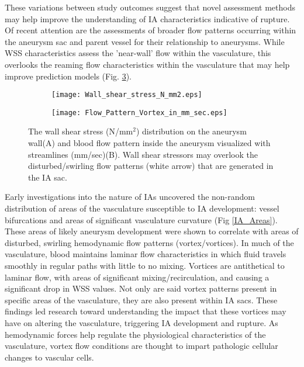 \begin{table}[h]
{\begin{tabular}{|l|p{40mm}|p{30mm}|c|p{25mm}|c|}
 \hline
\end{tabular}}
\label{Previous_Prediction_Tables}
\end{table}

These variations between study outcomes suggest that novel assessment methods may help improve the understanding of IA characteristics indicative of rupture. Of recent attention are the assessments of broader flow patterns occurring within the aneurysm sac and parent vessel for their relationship to aneurysms. While WSS characteristics assess the 'near-wall' flow within the vasculature, this overlooks the reaming flow characteristics within the vasculature that may help improve prediction models (Fig. \ref{WSS_vs_Disturbed}). 

\begin{figure}[h]
\begin{subfigure}
  \centering
  \texttt{[image: Wall\_shear\_stress\_N\_mm2.eps]}
  \label{fig:sfig1}
\end{subfigure}
\begin{subfigure}
  \centering
  \texttt{[image: Flow\_Pattern\_Vortex\_in\_mm\_sec.eps]}
  \label{fig:sfig2}
\end{subfigure}
\caption{The wall shear stress (N/mm$^2$) distribution on the aneurysm wall(A) and blood flow  pattern inside the aneurysm visualized with streamlines (mm/sec)(B). Wall shear stressors may overlook the disturbed/swirling flow patterns (white arrow) that are generated in the IA sac.}
\label{WSS_vs_Disturbed}
\end{figure}

Early investigations into the nature of IAs uncovered the non-random distribution of areas of the vasculature susceptible to IA development: vessel bifurcations and areas of significant vasculature curvature (Fig \ref{IA_Areas}). These areas of likely aneurysm development were shown to correlate with areas of disturbed, swirling hemodynamic flow patterns (vortex/vortices). In much of the vasculature, blood maintains laminar flow characteristics in which fluid travels smoothly in regular paths with little to no mixing. Vortices are antithetical to laminar flow, with areas of significant mixing/recirculation, and causing a significant drop in WSS values. Not only are said vortex patterns present in specific areas of the vasculature, they are also present within IA sacs. These findings led research toward understanding the impact that these vortices may have on altering the vasculature, triggering IA development and rupture\cite{Cebral119,chiu2011effects,Liu2015}. As hemodynamic forces help regulate the physiological characteristics of the vasculature, vortex flow conditions are thought to impart pathologic cellular changes to vascular cells. 

